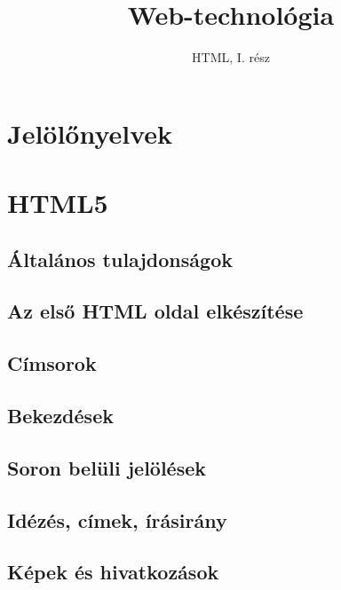 \documentclass[usenames,dvipsnames,aspectratio=169]{beamer}
\title[Web technológiák - HTML]{Web-technológia}
\subtitle{HTML, I. rész}
\begin{document}
\begin{frame}[plain]
  \titlepage
  \logoalul
\end{frame}

\section{Jelölőnyelvek}



\section{HTML5}

\subsection{Általános tulajdonságok}



\subsection{Az első HTML oldal elkészítése}



\subsection{Címsorok}



\subsection{Bekezdések}



\subsection{Soron belüli jelölések}



\subsection{Idézés, címek, írásirány}



\subsection{Képek és hivatkozások}
\end{document}
